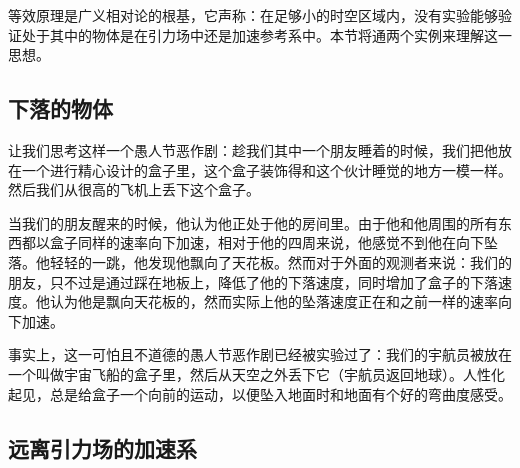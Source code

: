 
等效原理是广义相对论的根基，它声称：在足够小的时空区域内，没有实验能够验证处于其中的物体是在引力场中还是加速参考系中。本节将通两个实例来理解这一思想。

\subsection{下落的物体}
让我们思考这样一个愚人节恶作剧：趁我们其中一个朋友睡着的时候，我们把他放在一个进行精心设计的盒子里，这个盒子装饰得和这个伙计睡觉的地方一模一样。然后我们从很高的飞机上丢下这个盒子。

当我们的朋友醒来的时候，他认为他正处于他的房间里。由于他和他周围的所有东西都以盒子同样的速率向下加速，相对于他的四周来说，他感觉不到他在向下坠落。他轻轻的一跳，他发现他飘向了天花板。然而对于外面的观测者来说：我们的朋友，只不过是通过踩在地板上，降低了他的下落速度，同时增加了盒子的下落速度。他认为他是飘向天花板的，然而实际上他的坠落速度正在和之前一样的速率向下加速。

事实上，这一可怕且不道德的愚人节恶作剧已经被实验过了：我们的宇航员被放在一个叫做宇宙飞船的盒子里，然后从天空之外丢下它（宇航员返回地球）。人性化起见，总是给盒子一个向前的运动，以便坠入地面时和地面有个好的弯曲度感受。

\subsection{远离引力场的加速系}


